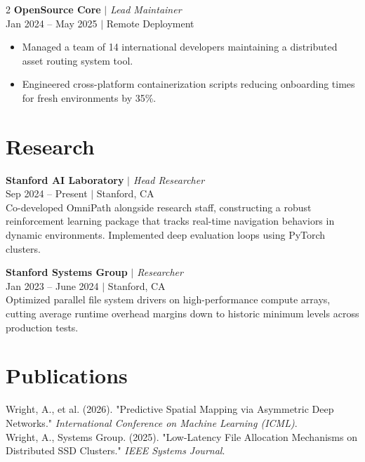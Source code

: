 \documentclass[letterpaper,10pt]{article}
\newcommand{\descript}[1]{{\color{subheadings}\textit{\small #1}}}
\newcommand{\location}[1]{{\color{graytext}\footnotesize #1}}
\newcommand{\runsubsection}[1]{{\color{subheadings}\bfseries\large #1}}
\newcommand{\sectionsep}{\vspace{3pt}}
\newenvironment{tightemize}{
  \begin{itemize}[leftmargin=3mm, topsep=1pt, itemsep=2pt, parsep=0pt]
}{
  \end{itemize}
}
\begin{document}
\begin{paracol}{2}
\runsubsection{OpenSource Core} \descript{$|$ Lead Maintainer} \\
\location{Jan 2024 -- May 2025 $|$ Remote Deployment}
\begin{tightemize}
    \item Managed a team of 14 international developers maintaining a distributed asset routing system tool.
    \item Engineered cross-platform containerization scripts reducing onboarding times for fresh environments by 35\%.
\end{tightemize}
\sectionsep

\section{Research}

\runsubsection{Stanford AI Laboratory} \descript{$|$ Head Researcher} \\
\location{Sep 2024 -- Present $|$ Stanford, CA} \\
{\small Co-developed OmniPath alongside research staff, constructing a robust reinforcement learning package that tracks real-time navigation behaviors in dynamic environments. Implemented deep evaluation loops using PyTorch clusters.}
\sectionsep

\runsubsection{Stanford Systems Group} \descript{$|$ Researcher} \\
\location{Jan 2023 -- June 2024 $|$ Stanford, CA} \\
{\small Optimized parallel file system drivers on high-performance compute arrays, cutting average runtime overhead margins down to historic minimum levels across production tests.}
\sectionsep

\section{Publications}
{\small
\noindent Wright, A., et al. (2026). "Predictive Spatial Mapping via Asymmetric Deep Networks." \textit{International Conference on Machine Learning (ICML)}. \\ \vspace{2pt}
\noindent Wright, A., Systems Group. (2025). "Low-Latency File Allocation Mechanisms on Distributed SSD Clusters." \textit{IEEE Systems Journal}.
}
\sectionsep

\end{paracol}
\end{document}

